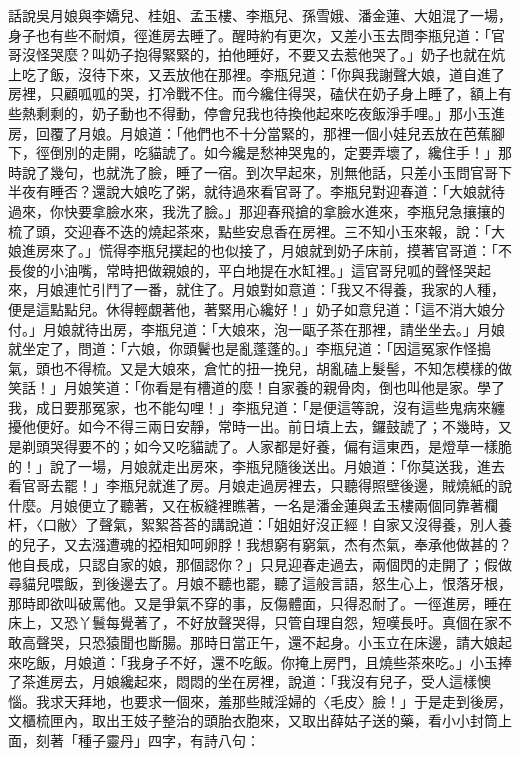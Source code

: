 \begin{showcontents}{}
話說吳月娘與李嬌兒、桂姐、孟玉樓、李瓶兒、孫雪娥、潘金蓮、大姐混了一場，身子也有些不耐煩，徑進房去睡了。醒時約有更次，又差小玉去問李瓶兒道：「官哥沒怪哭麼？叫奶子抱得緊緊的，拍他睡好，不要又去惹他哭了。」奶子也就在炕上吃了飯，沒待下來，又丟放他在那裡。李瓶兒道：「你與我謝聲大娘，道自進了房裡，只顧呱呱的哭，打冷戰不住。而今纔住得哭，磕伏在奶子身上睡了，額上有些熱剩剩的，奶子動也不得動，停會兒我也待換他起來吃夜飯淨手哩。」那小玉進房，回覆了月娘。月娘道：「他們也不十分當緊的，那裡一個小娃兒丟放在芭蕉腳下，徑倒別的走開，吃貓諕了。如今纔是愁神哭鬼的，定要弄壞了，纔住手！」那時說了幾句，也就洗了臉，睡了一宿。到次早起來，別無他話，只差小玉問官哥下半夜有睡否？還說大娘吃了粥，就待過來看官哥了。李瓶兒對迎春道：「大娘就待過來，你快要拿臉水來，我洗了臉。」那迎春飛搶的拿臉水進來，李瓶兒急攘攘的梳了頭，交迎春不迭的燒起茶來，點些安息香在房裡。三不知小玉來報，說：「大娘進房來了。」慌得李瓶兒撲起的也似接了，月娘就到奶子床前，摸著官哥道：「不長俊的小油嘴，常時把做親娘的，平白地提在水缸裡。」這官哥兒呱的聲怪哭起來，月娘連忙引鬥了一番，就住了。月娘對如意道：「我又不得養，我家的人種，便是這點點兒。休得輕覷著他，著緊用心纔好！」奶子如意兒道：「這不消大娘分付。」月娘就待出房，李瓶兒道：「大娘來，泡一甌子茶在那裡，請坐坐去。」月娘就坐定了，問道：「六娘，你頭鬢也是亂蓬蓬的。」李瓶兒道：「因這冤家作怪搗氣，頭也不得梳。又是大娘來，倉忙的扭一挽兒，胡亂磕上髮髻，不知怎模樣的做笑話！」月娘笑道：「你看是有槽道的麼！自家養的親骨肉，倒也叫他是家。學了我，成日要那冤家，也不能勾哩！」李瓶兒道：「是便這等說，沒有這些鬼病來纏擾他便好。如今不得三兩日安靜，常時一出。前日墳上去，鑼鼓諕了；不幾時，又是剃頭哭得要不的；如今又吃貓諕了。人家都是好養，偏有這東西，是燈草一樣脆的！」說了一場，月娘就走出房來，李瓶兒隨後送出。月娘道：「你莫送我，進去看官哥去罷！」李瓶兒就進了房。月娘走過房裡去，只聽得照壁後邊，賊燒紙的說什麼。月娘便立了聽著，又在板縫裡瞧著，一名是潘金蓮與孟玉樓兩個同靠著欄杆，〈口敝〉了聲氣，絮絮荅荅的講說道：「姐姐好沒正經！自家又沒得養，別人養的兒子，又去漒遭魂的掗相知呵卵脬！我想窮有窮氣，杰有杰氣，奉承他做甚的？他自長成，只認自家的娘，那個認你？」只見迎春走過去，兩個閃的走開了；假做尋貓兒喂飯，到後邊去了。月娘不聽也罷，聽了這般言語，怒生心上，恨落牙根，那時即欲叫破罵他。又是爭氣不穿的事，反傷體面，只得忍耐了。一徑進房，睡在床上，又恐丫鬟每覺著了，不好放聲哭得，只管自理自怨，短嘆長吁。真個在家不敢高聲哭，只恐猿聞也斷腸。那時日當正午，還不起身。小玉立在床邊，請大娘起來吃飯，月娘道：「我身子不好，還不吃飯。你掩上房門，且燒些茶來吃。」小玉捧了茶進房去，月娘纔起來，悶悶的坐在房裡，說道：「我沒有兒子，受人這樣懊惱。我求天拜地，也要求一個來，羞那些賊淫婦的〈毛皮〉臉！」于是走到後房，文櫃梳匣內，取出王妓子整治的頭胎衣胞來，又取出薛姑子送的藥，看小小封筒上面，刻著「種子靈丹」四字，有詩八句：


\end{showcontents}
